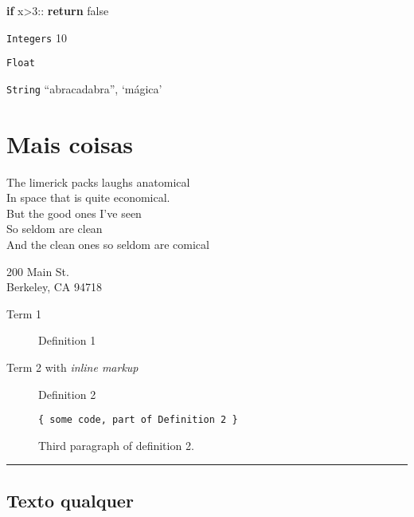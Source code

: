 \documentclass{article}
\newenvironment{Shaded}{}{}
\newcommand{\ControlFlowTok}[1]{\textcolor[rgb]{0.00,0.44,0.13}{\textbf{#1}}}
\newcommand{\DecValTok}[1]{\textcolor[rgb]{0.25,0.63,0.44}{#1}}
\newcommand{\NormalTok}[1]{#1}
\newcommand{\OperatorTok}[1]{\textcolor[rgb]{0.40,0.40,0.40}{#1}}
\begin{document}
\begin{multicols*}{4}
\begin{Shaded}
\begin{Highlighting}[]
\ControlFlowTok{if}\NormalTok{ x}\OperatorTok{>}\DecValTok{3}\NormalTok{::}
   \ControlFlowTok{return}\NormalTok{ false}
\end{Highlighting}
\end{Shaded}

\texttt{Integers} \hfill 10

\texttt{Float} 

\texttt{String} \hrulefill ``abracadabra'', `mágica'


\section{Mais coisas}

The limerick packs laughs anatomical\\
In space that is quite economical.\\
\hspace*{0.333em}\hspace*{0.333em}\hspace*{0.333em}But the good ones
I've seen\\
\hspace*{0.333em}\hspace*{0.333em}\hspace*{0.333em}So seldom are clean\\
And the clean ones so seldom are comical

200 Main St.\\
Berkeley, CA 94718


\begin{description}
\item[Term 1]
Definition 1
\item[Term 2 with \emph{inline markup}]
Definition 2

\begin{verbatim}
{ some code, part of Definition 2 }
\end{verbatim}

Third paragraph of definition 2.
\end{description}

\begin{center}\rule{0.5\linewidth}{\linethickness}\end{center}



\subsectionfont{\color{red}}

\subsection{Texto qualquer}


\end{multicols*}
\end{document}
